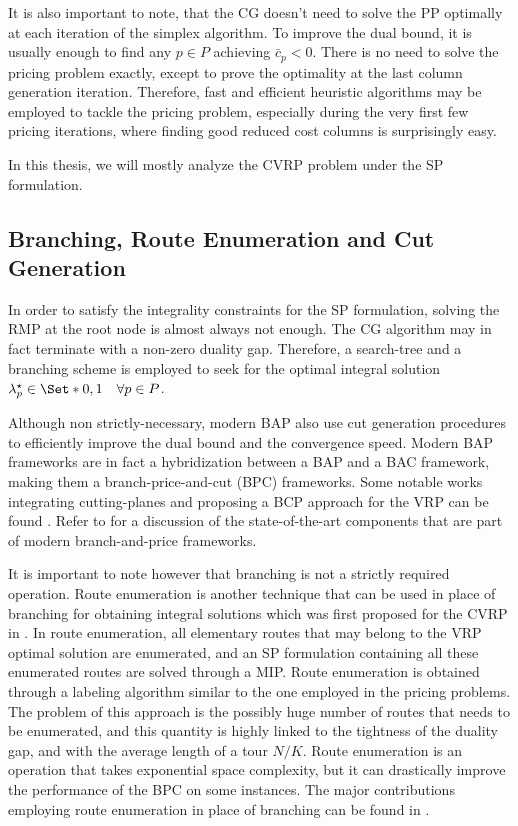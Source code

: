 \medskip

It is also important to note,
that the CG doesn't need to solve the PP optimally at each iteration of the simplex algorithm.
To improve the dual bound,
it is usually enough to find any $p \in P$ achieving $\bar{c}_p < 0$.
There is no need to solve the pricing problem exactly,
except to prove the optimality at the last column generation iteration.
Therefore, fast and efficient heuristic algorithms may be employed
to tackle the pricing problem,
especially during the very first few pricing iterations,
where finding good reduced cost columns is surprisingly easy.

\medskip

In this thesis, we will mostly analyze the CVRP problem under the SP formulation.

\subsection{Branching, Route Enumeration and Cut Generation}
\label{sec:intro-branching-and-cut-generation-within-bap-frameworks}

In order to satisfy the integrality constraints for the SP formulation,
solving the RMP at the root node is almost always not enough.
The CG algorithm may in fact terminate with a non-zero duality gap.
Therefore,
a search-tree and a branching scheme is employed
to seek for the optimal integral solution $\lambda^\star_p \in \Set*{0, 1} \quad \forall p \in P$.

Although non strictly-necessary, modern BAP also use
cut generation procedures to efficiently improve the dual bound and the convergence speed.
Modern BAP frameworks
are in fact a hybridization between a BAP and a BAC framework,
making them a branch-price-and-cut (BPC) frameworks.
Some notable works integrating cutting-planes and proposing
a BCP approach for the VRP can be found \textcite{fukasawa2006, ropke2012}.
Refer to \textcite{sadykov2019modern} for a discussion of the state-of-the-art
components that are part of modern branch-and-price frameworks.

\medskip

It is important to note however that branching is not a strictly required operation.
Route enumeration is another technique that can be used in place of branching
for obtaining integral solutions which was first proposed for the CVRP in \textcite{baldacci2008}.
In route enumeration, all elementary routes that may belong to the VRP optimal solution are enumerated,
and an SP formulation containing all these enumerated routes are solved through a MIP.
Route enumeration is obtained through a labeling algorithm similar to the one employed in the pricing problems.
The problem of this approach is the possibly huge number of routes that needs to be enumerated,
and this quantity is highly linked to the tightness of the duality gap,
and with the average length of a tour $N / K$.
Route enumeration is an operation that takes exponential space complexity,
but it can drastically improve the performance of the BPC on some instances.
The major contributions employing route enumeration in place of branching can be found in
\textcite{baldacci2008,baldacci2011}.

